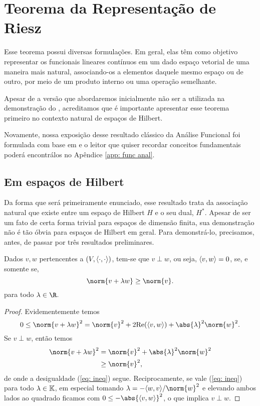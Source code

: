 \section{Teorema da Representação de Riesz}

Esse teorema possui diversas formulações.
Em geral, elas têm como objetivo representar os funcionais lineares contínuos em um dado espaço vetorial de uma maneira mais natural, associando-os a elementos daquele mesmo espaço ou de outro, por meio de um produto interno ou uma operação semelhante.

Apesar de a versão que abordaremos inicialmente não ser a utilizada na demonstração do \uat, acreditamos que é importante apresentar esse teorema primeiro no contexto natural de espaços de Hilbert.

Novamente, nossa exposição desse resultado clássico da Análise Funcional foi formulada com base em \cite{func-anal} e o leitor que quiser recordar conceitos fundamentais poderá encontrálos no Apêndice \ref{app: func anal}.

\subsection{Em espaços de Hilbert}

Da forma que será primeiramente enunciado, esse resultado trata da associação natural que existe entre um espaço de Hilbert \( H \) e o seu dual, \( H^{ * } \). Apesar de ser um fato de certa forma trivial para espaços de dimensão finita, sua demonstração não é tão óbvia para espaços de Hilbert em geral.
Para demonstrá-lo, precisamos, antes, de passar por três resultados preliminares.

\begin{lem}
    Dados \( v, w \) pertencentes a \( (V, \langle\cdot,\cdot\rangle) \), tem-se que \( v \perp w \), ou seja, \( \langle v,w\rangle = 0 \), se, e somente se,
    \begin{equation}
        \norm{ v + \lambda w } \geq \norm{ v }
        \label{eq: ineq}
    .\end{equation}
    para todo \( \lambda \in \R \).
    \label{lem: perp_equiv}
\end{lem}
\begin{proof}
    Evidementemente temos \[
        0
        \leq \norm{ v + \lambda w }^2
        = \norm{ v }^2 + 2 \Re (\dotprod{v,w}) + \abs{ \lambda }^2 \norm{ w }^2
    .\]
    Se \( v \perp w \), então temos
    \begin{align*}
        \norm{ v + \lambda w }^2
        &= \norm{ v }^2 + \abs{ \lambda }^2 \norm{ w }^2 \\
        &\geq \norm{ v }^2
    ,\end{align*}
    de onde a desigualdade (\ref{eq: ineq}) segue.
    Reciprocamente, se vale (\ref{eq: ineq}) para todo \( \lambda \in \mathbb{K} \), em especial tomando \( \lambda = -\dotprod{w,v}/ \norm{ w }^2 \) e elevando ambos lados ao quadrado ficamos com \( 0 \leq - \abs{ \dotprod{v,w} }^2 \), o que implica \( v \perp w \).
\end{proof}

